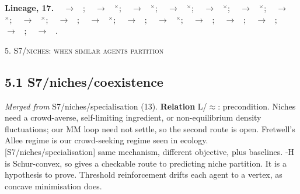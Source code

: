 \documentclass[10pt]{article}
\newcommand{\memb}[1]{\par\smallskip\textbf{#1}\quad}
\begin{document}
\memb{Lineage, 17.} {\footnotesize \citeauthor{Couzin-effective05}~\citeyear{Couzin-effective05} $\to$ \citeauthor{Heins-collective24}~\citeyear{Heins-collective24}; \citeauthor{Hamann-evolution14}~\citeyear{Hamann-evolution14} $\to$ \citeauthor{Hamann-evolution15}~\citeyear{Hamann-evolution15}$^\times$; \citeauthor{Hamann-evolution14}~\citeyear{Hamann-evolution14} $\to$ \citeauthor{Zahadat-evolving15}~\citeyear{Zahadat-evolving15}$^\times$; \citeauthor{Hamann-evolution14}~\citeyear{Hamann-evolution14} $\to$ \citeauthor{Zahadat-evolving15b}~\citeyear{Zahadat-evolving15b}$^\times$; \citeauthor{Hamann-evolution14}~\citeyear{Hamann-evolution14} $\to$ \citeauthor{Kaiser-self19b}~\citeyear{Kaiser-self19b}$^\times$; \citeauthor{Hamann-evolution14}~\citeyear{Hamann-evolution14} $\to$ \citeauthor{Kaiser-innate22b}~\citeyear{Kaiser-innate22b}$^\times$; \citeauthor{Friston-duet15}~\citeyear{Friston-duet15} $\to$ \citeauthor{Kaufmann-active21}~\citeyear{Kaufmann-active21}$^\times$; \citeauthor{Friston-knowing15}~\citeyear{Friston-knowing15} $\to$ \citeauthor{Maisto-flock25}~\citeyear{Maisto-flock25}$^\times$; \citeauthor{Hatzikirou-statistical18}~\citeyear{Hatzikirou-statistical18} $\to$ \citeauthor{Barua-least20}~\citeyear{Barua-least20}; \citeauthor{Kaiser-engineered19}~\citeyear{Kaiser-engineered19} $\to$ \citeauthor{Kaiser-innate22}~\citeyear{Kaiser-innate22}$^\times$; \citeauthor{Barua-least20}~\citeyear{Barua-least20} $\to$ \citeauthor{Barua-entropydriven20}~\citeyear{Barua-entropydriven20}; \citeauthor{Kaiser-evolution20}~\citeyear{Kaiser-evolution20} $\to$ \citeauthor{Kaiser-innate22}~\citeyear{Kaiser-innate22}$^\times$; \citeauthor{Barua-entropydriven20}~\citeyear{Barua-entropydriven20} $\to$ \citeauthor{Gupta-entropydriven24}~\citeyear{Gupta-entropydriven24}; \citeauthor{Kaufmann-active21}~\citeyear{Kaufmann-active21} $\to$ \citeauthor{Albarracin-epistemic22}~\citeyear{Albarracin-epistemic22}; \citeauthor{Kaufmann-active21}~\citeyear{Kaufmann-active21} $\to$ \citeauthor{Nomura-social26}~\citeyear{Nomura-social26}; \citeauthor{Heins-collective24}~\citeyear{Heins-collective24} $\to$ \citeauthor{Maisto-flock25}~\citeyear{Maisto-flock25}; \citeauthor{Heins-collective24}~\citeyear{Heins-collective24} $\to$ \citeauthor{Gupta-optimal26}~\citeyear{Gupta-optimal26}.}

\medskip\textsc{5. S7/niches: when similar agents partition}

\subsection{5.1 S7/niches/coexistence}\label{node:S7-S7-niches-coexistence}
\textit{Merged from} S7/niches/specialisation (13). \textbf{Relation} \textsf{L}/$\approx$: precondition. Niches need a crowd-averse, self-limiting ingredient, or non-equilibrium density fluctuations; our MM loop need not settle, so the second route is open. Fretwell's Allee regime is our crowd-seeking regime seen in ecology. [S7/niches/specialisation] same mechanism, different objective, plus baselines. -H is Schur-convex, so \citet{Amir-when26} gives a checkable route to predicting niche partition. It is a hypothesis to prove. Threshold reinforcement drifts each agent to a vertex, as concave minimisation does.
\end{document}
